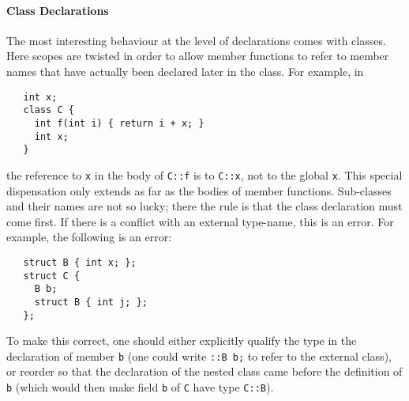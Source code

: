 \documentclass[11pt]{article}
\begin{document}
\paragraph{Class Declarations} The most interesting behaviour at the
level of declarations comes with classes.  Here scopes are twisted in
order to allow member functions to refer to member names that have
actually been declared later in the class.  For example, in
\begin{verbatim}
   int x;
   class C {
     int f(int i) { return i + x; }
     int x;
   }
\end{verbatim}
the reference to \texttt{x} in the body of \texttt{C::f} is to
\texttt{C::x}, not to the global \texttt{x}.  This special
dispensation only extends as far as the bodies of member functions.
Sub-classes and their names are not so lucky; there the rule is that
the class declaration must come first.  If there is a conflict with an
external type-name, this is an error.  For example, the
following is an error:
\begin{verbatim}
   struct B { int x; };
   struct C {
     B b;
     struct B { int j; };
   };
\end{verbatim}
To make this correct, one should either explicitly qualify the type in
the declaration of member \texttt{b} (one could write \texttt{::B~b;}
to refer to the external class), or reorder so that the declaration of
the nested class came before the definition of \texttt{b} (which would
then make field \texttt{b} of \texttt{C} have type \texttt{C::B}).
\end{document}
